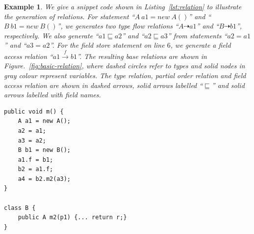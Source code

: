 \documentclass{fac}
\newtheorem{Example}{Example}
\newcommand{\less}{\sqsubseteq}
\newcommand{\tflow}{\dashrightarrow}
\newcommand{\hflow}{\longrightarrow}
\newcommand{\lhflow}[1]{\stackrel{#1}{\hflow}}
\begin{document}
\begin{Example}\label{ex:def1}
We give a snippet code shown in Listing~\ref{lst:relation} to illustrate the generation of relations. For statement ``$A\ a1=new \ A()$'' and ``$B\ b1=new\ B()$'', we generates two type flow relations ``$A \tflow a1$'' and ``$B \tflow b1$'', respectively. We also generate ``$a1 \less a2$'' and ``$a2 \less a3$'' from statements ``$a2=a1$'' and ``$a3=a2$''. For the field store statement on line $6$, we generate a field access relation ``$a1 \lhflow{f} b1$''. The resulting base relations are shown in Figure.~\ref{fig:basic-relation}, where dashed circles refer to types and solid nodes in gray colour represent variables. The type relation, partial order relation and field access relation are shown in dashed arrows, solid arrows labelled ``$\less$'' and solid arrows labelled with field names.
\end{Example}
\begin{minipage}{\linewidth}
\vspace{10pt}
\begin{lstlisting}[caption={An example showing the generation of base relations},label={lst:relation}]
public void m() {
	A a1 = new A();
	a2 = a1;
	a3 = a2;
	B b1 = new B();
	a1.f = b1;
	b2 = a1.f;
	a4 = b2.m2(a3);
}

class B {
	public A m2(p1) {... return r;}
}
\end{lstlisting}
\end{minipage}
\end{document}
